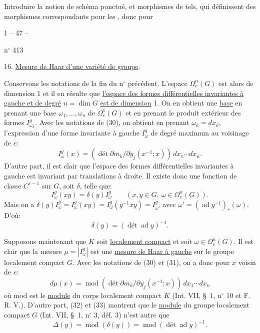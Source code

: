 Introduire la notion de schéma  ponctué,
et morphismes de tels, qui définissent des morphismes correspondants pour les
,
donc pour

\begin{center}1 -- 47 --\end{center}\hfill n$^\circ$ 413

16. \uline{Mesure de Haar d'une variété de groupe}.

Conservons les notations de la fin du n$^\circ$ précédent.
L'espace $\Omega_e^n(G)$ est alors de dimension 1 et il en résulte que \uline{l'espace des formes différentielles invariantes à gauche et de degré} $n=\dim G$ \uline{est de dimension} 1.
On en obtient une \uline{base} en prenant une base $\omega_1,\ldots,\omega_n$ de $\Omega_e^1(G)$ et en prenant le produit extérieur des formes $I_{\omega_k}^g$.
Avec les notations de (30), on obtient en prenant $\omega_k=dx_k$, l'expression d'une forme invariante à gauche $I_\omega^g$ de degré maximum au voisinage de $e$:
\[
\tag{31}I_\omega^g(x)=(\operatorname{dét}\partial m_k/\partial y_j(x^{-1};x))\,dx_1\cdots dx_n.
\]
D'autre part, il est clair que l'espace des formes différentielles invariantes à gauche est invariant par translations à droite.
Il existe donc une fonction de classe $C^{r-1}$ sur $G$, soit $\delta$, telle que:
\[
\tag{32}I_\omega^g(xy)=\delta(y)I_\omega^g\qquad(x,y\in G,\ \omega\in\Omega_e^n(G)).
\]
Mais on a $\delta(y)I_\omega^g=I_\omega^g(xy)=I_\omega^g(y^{-1}xy)=I_{\omega'}^g$ avec $\omega'=(\operatorname{ad}y^{-1})_*(\omega)$.
D'où:
\[
\tag{33}\delta(y)=(\operatorname{dét}\operatorname{ad}y)^{-1}.
\]

Supposons maintenant que $K$ soit \uline{localement compact} et soit $\omega\in\Omega_e^n(G)$.
Il est clair que la mesure $\mu=|I_\omega^g|$ est une \uline{mesure de Haar à gauche} sur le groupe localement compact $G$.
Avec les notations de (30) et (31), on a donc pour $x$ voisin de $e$:
\[
\tag{34}d\mu(x)=\operatorname{mod}(\operatorname{dét}\partial m_k/\partial y_j(x^{-1};x))\,dx_1\cdots dx_n
\]
où mod est le \uline{module} du corps localement compact $K$ (Int. VII, \S\ 1, n$^\circ$ 10 et F. R. V.).
D'autre part, (32) et (33) montrent que le \uline{module} du groupe localement compact $G$ (Int. VII, \S\ 1, n$^\circ$ 3, déf. 3) n'est autre que
\[
\tag{35}\Delta(y)=\operatorname{mod}(\delta(y))=\operatorname{mod}(\operatorname{dét}\operatorname{ad}y)^{-1}.
\]

